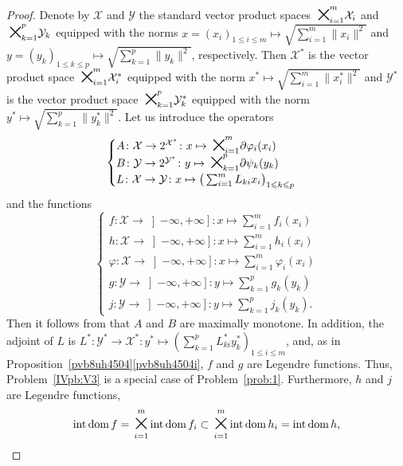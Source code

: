 \documentclass[a4paper,11pt,fleqn]{article}
\renewcommand{\leq}{\ensuremath{\leqslant}}
\newcommand{\RX}{\ensuremath{\left]-\infty,+\infty\right]}}
\newcommand{\XX}{\ensuremath{{\mathcal X}}}
\newcommand{\YY}{\ensuremath{{\mathcal Y}}}
\newcommand{\dom}{\ensuremath{\text{\rm dom}\,}}
\newcommand{\Cart}{\ensuremath{\raisebox{-0.5mm}{\mbox{\huge{$\times$}}}}}
\newcommand{\inte}{\ensuremath{\text{\rm int}\,}}
\newcommand{\intdom}{\ensuremath{\text{\rm int\,dom}\,}}
\theoremstyle{plain}{\theorembodyfont{\rmfamily}%
\newtheorem{conjecture}[theorem]{Conjecture}}
\theoremstyle{plain}{\theorembodyfont{\rmfamily}%
\newtheorem{example}[theorem]{Example}}
\theoremstyle{plain}{\theorembodyfont{\rmfamily}%
\newtheorem{remark}[theorem]{Remark}}
\theoremstyle{plain}{\theorembodyfont{\rmfamily}%
\newtheorem{algorithm}[theorem]{Algorithm}}
\theoremstyle{plain}{\theorembodyfont{\rmfamily}%
\newtheorem{condition}[theorem]{Condition}}
\theoremstyle{plain}{\theorembodyfont{\rmfamily}%
\newtheorem{definition}[theorem]{Definition}}
\theoremstyle{plain}{\theorembodyfont{\rmfamily}
\newtheorem{problem}[theorem]{Problem}}
\theoremstyle{plain}{\theorembodyfont{\rmfamily}
\newtheorem{notation}[theorem]{Notation}}
\numberwithin{equation}{section}
\begin{document}
\begin{proof}
Denote by $\XX$ and $\YY$ the standard vector product spaces 
$\Cart_{\!\!i=1}^{\!\!m}\XX_i$ and 
$\Cart_{\!\!k=1}^{\!\!p}\YY_k$ equipped with the norms 
$x=(x_i)_{1\leq i\leq m}\mapsto\sqrt{\sum_{i=1}^m\|x_i\|^2}$ and 
$y=(y_k)_{1\leq k\leq p}\mapsto\sqrt{\sum_{k=1}^p\|y_k\|^2}$,
respectively. Then $\XX^*$ is the vector product space 
$\Cart_{\!\!i=1}^{\!\!m}\XX_i^*$ equipped with the norm 
$x^*\mapsto\sqrt{\sum_{i=1}^m\|x_i^*\|^2}$ 
and $\YY^*$ is the vector product space 
$\Cart_{\!\!k=1}^{\!\!p}\YY_k^*$ equipped with the norm 
$y^*\mapsto\sqrt{\sum_{k=1}^p\|y_k^*\|^2}$. 
Let us introduce the operators
\begin{equation}
\label{4e:opt1}
\begin{cases}
A\colon\XX\to 2^{\XX^*}\colon x\mapsto
\Cart_{\!\!i=1}^{\!\!m}\partial\varphi_i(x_i)\\
B\colon\YY\to 2^{\YY^*}\colon y
\mapsto\Cart_{\!\!k=1}^{\!\!p}\partial\psi_k(y_k)\\
L\colon\XX\to\YY\colon x\mapsto
\big(\sum_{i=1}^mL_{ki}x_i\big)_{1\leq k\leq p}
\end{cases}
\end{equation}
and the functions
\begin{equation}
\label{4e:funct1}
\begin{cases}
f\colon\XX\to\RX\colon x\mapsto\sum_{i=1}^mf_i(x_i)\\
h\colon\XX\to\RX\colon x\mapsto\sum_{i=1}^mh_i(x_i)\\
\varphi\colon\XX\to\RX\colon x\mapsto\sum_{i=1}^m\varphi_i(x_i)\\
g\colon\YY\to\RX\colon y\mapsto\sum_{k=1}^pg_k(y_k)\\
j\colon\YY\to\RX\colon y\mapsto\sum_{k=1}^pj_k(y_k).
\end{cases}
\end{equation}
Then it follows from \cite[Theorem~3.1.11]{IVZali02} that $A$ 
and $B$ are maximally monotone. In addition, the adjoint of $L$ is 
$L^*\colon\YY^*\to\XX^*\colon y^*\mapsto(\sum_{k=1}^p
L_{ki}^*y_k^*)_{1\leq i\leq m}$, and, as in
Proposition~\ref{pvb8uh4504}\ref{pvb8uh4504i},
$f$ and $g$ are Legendre functions. 
Thus, Problem~\ref{IVpb:V3} is a special case of 
Problem~\ref{prob:1}. Furthermore, $h$ and $j$ are Legendre
functions,
\begin{equation}
\label{ekIuh711a}
\intdom f=\underset{i=1}{\overset{m}{\Cart}}\inte\dom f_i\subset
\underset{i=1}{\overset{m}{\Cart}}\inte\dom h_i=\intdom h,
\end{equation}

\end{proof}
\end{document}
